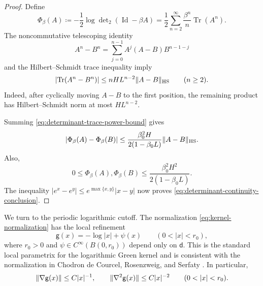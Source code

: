 \documentclass[11pt,reqno]{amsart}
\numberwithin{equation}{section}
\theoremstyle{plain}
\theoremstyle{definition}
\DeclarePairedDelimiter{\abs}{\lvert}{\rvert}
\DeclarePairedDelimiter{\norm}{\lVert}{\rVert}
\renewcommand{\d}{\mathsf d}
\newcommand{\Id}{\operatorname{Id}}
\newcommand{\Tr}{\operatorname{Tr}}
\newcommand{\HS}{\mathrm{HS}}
\newcommand{\be}{\beta}
\newcommand{\g}{\mathsf g}
\begin{document}
\begin{proof}
Define
\begin{equation}
 \Phi_{\be}(A)
 \coloneqq-\frac12\log\det\nolimits_2(\Id-\be A)
 =\frac12\sum_{n=2}^\infty\frac{\be^n}{n}\Tr(A^n).
 \label{eq:determinant-Phi}
\end{equation}
The noncommutative telescoping identity
\begin{equation}
 A^n-B^n
 =\sum_{j=0}^{n-1}A^j(A-B)B^{n-1-j}
 \label{eq:determinant-power-telescoping}
\end{equation}
and the Hilbert--Schmidt trace inequality imply
\begin{equation}
 \abs{\Tr(A^n-B^n)}
 \leq nHL^{n-2}\norm{A-B}_{\HS}
 \qquad(n\geq2).
 \label{eq:determinant-trace-power-bound}
\end{equation}
Indeed, after cyclically moving $A-B$ to the first position, the remaining product has Hilbert--Schmidt norm at most $HL^{n-2}$.

Summing \eqref{eq:determinant-trace-power-bound} gives
\begin{equation}
 \abs{\Phi_{\be}(A)-\Phi_{\be}(B)}
 \leq\frac{\be_0^2H}{2(1-\be_0L)}
 \norm{A-B}_{\HS}.
 \label{eq:determinant-Phi-Lipschitz}
\end{equation}
Also,
\begin{equation}
 0\leq\Phi_{\be}(A),\Phi_{\be}(B)
 \leq\frac{\be_0^2H^2}{2(1-\be_0L)}.
 \label{eq:determinant-Phi-bound}
\end{equation}
The inequality $|e^x-e^y|\leq e^{\max\{x,y\}}|x-y|$ now proves \eqref{eq:determinant-continuity-conclusion}.
\end{proof}

We turn to the periodic logarithmic cutoff.  The normalization \eqref{eq:kernel-normalization} has the local refinement
\begin{equation}
 \g(x)=-\log|x|+\psi(x)
 \qquad(0<|x|<r_0),
 \label{eq:kernel-smooth-local-form}
\end{equation}
where $r_0>0$ and $\psi\in C^\infty(B(0,r_0))$ depend only on $\d$.  This is the standard local parametrix for the logarithmic Green kernel and is consistent with the normalization in Chodron de Courcel, Rosenzweig, and Serfaty \cite{ChodrondeCourcelRosenzweigSerfaty2025}.  In particular,
\begin{equation}
 \norm{\nabla\g(x)}\leq C|x|^{-1},
 \qquad
 \norm{\nabla^2\g(x)}\leq C|x|^{-2}
 \qquad(0<|x|<r_0).
 \label{eq:kernel-derivative-bounds}
\end{equation}
\end{document}
